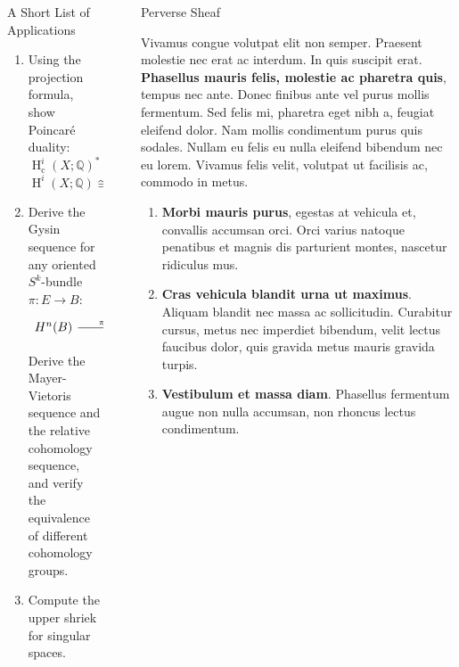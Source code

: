 \documentclass[final]{beamer}
\newlength{\sepwidth}
\newlength{\colwidth}
\newcommand{\separatorcolumn}{\begin{column}{\sepwidth}\end{column}}
\DeclareMathOperator{\Hcohom}{\operatorname{H}}
\DeclareMathOperator{\cpt}{\operatorname{c}}
\DeclareMathOperator{\Or}{\operatorname{Or}}
\begin{document}
\begin{frame}[t]
\begin{columns}[t]
\begin{column}{\colwidth}
\begin{alertblock}{A Short List of Applications}
\begin{enumerate}
\item Using the projection formula, show Poincaré duality:
$$\Hcohom^i_{\cpt}(X;\mathbb{Q})^* \cong \Hcohom^{n-i}(X; \Or_X)$$
$$\Hcohom^i(X;\mathbb{Q}) \cong \Hcohom^{n-i}_{\cpt}(X; \Or_X)^*$$


\item Derive the Gysin sequence for any oriented \( S^k \)-bundle \( \pi: E \longrightarrow B \):
\[\begin{tikzcd}[ampersand replacement=\&, column sep = 15mm]
	{H^n(B)} \& {H^n(E)} \& {H^{n-k}(B)} \& {}
	\arrow["{\pi^*}", from=1-1, to=1-2]
	\arrow["{\pi_*}", from=1-2, to=1-3]
	\arrow["{+1}", from=1-3, to=1-4]
	\arrow["{eu_{\pi}}"', from=1-3, to=1-4]
\end{tikzcd}\]

   Derive the Mayer-Vietoris sequence and the relative cohomology sequence, and verify the equivalence of different cohomology groups.

\item Compute the upper shriek for singular spaces.
\end{enumerate}


  \end{alertblock}

\end{column}

\separatorcolumn

\begin{column}{\colwidth}

  \begin{block}{Perverse Sheaf}

    Vivamus congue volutpat elit non semper. Praesent molestie nec erat ac
    interdum. In quis suscipit erat. \textbf{Phasellus mauris felis, molestie
    ac pharetra quis}, tempus nec ante. Donec finibus ante vel purus mollis
    fermentum. Sed felis mi, pharetra eget nibh a, feugiat eleifend dolor. Nam
    mollis condimentum purus quis sodales. Nullam eu felis eu nulla eleifend
    bibendum nec eu lorem. Vivamus felis velit, volutpat ut facilisis ac,
    commodo in metus.

    \begin{enumerate}
      \item \textbf{Morbi mauris purus}, egestas at vehicula et, convallis
        accumsan orci. Orci varius natoque penatibus et magnis dis parturient
        montes, nascetur ridiculus mus.
      \item \textbf{Cras vehicula blandit urna ut maximus}. Aliquam blandit nec
        massa ac sollicitudin. Curabitur cursus, metus nec imperdiet bibendum,
        velit lectus faucibus dolor, quis gravida metus mauris gravida turpis.
      \item \textbf{Vestibulum et massa diam}. Phasellus fermentum augue non
        nulla accumsan, non rhoncus lectus condimentum.
    \end{enumerate}


\end{block}
\end{column}
\end{columns}
\end{frame}
\end{document}

